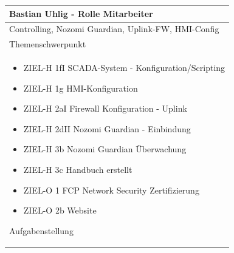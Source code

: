 \documentclass[
	headings=optiontotocandhead,%
	oneside,
	numbers=noenddot,%
	toc=flat, %
	10pt, %
	parskip=full, %
	listof=totoc, %
	listof=flat, %
	numbers=noenddot, %
	bibliography=totoc, %
	a4paper,DIV=14,
]{scrartcl}
\begin{document}
\begin{table}[H]
	\begin{tabularx} {\textwidth} {
			|>{\hsize=1\hsize}X|
		}
		
		\hline
		\rowcolor[HTML]{D9D9D9} 
		\rule{0pt}{15pt}
		\textbf{\normalsize{Bastian Uhlig - Rolle Mitarbeiter}} \\ \hline
		
		\rule{0pt}{20pt} Controlling, Nozomi Guardian, Uplink-FW, HMI-Config \\
		\rule{0pt}{11pt}\textcolor[HTML]{A6A6A6}{\footnotesize{Themenschwerpunkt}} \\ \hline
		
		\begin{itemize}[itemsep=0pt, parsep=0pt, topsep=0pt]
			\item{ZIEL-H 1fI SCADA-System - Konfiguration/Scripting}
			\item{ZIEL-H 1g HMI-Konfiguration}
			\item{ZIEL-H 2aI Firewall Konfiguration - Uplink}
			\item{ZIEL-H 2dII Nozomi Guardian - Einbindung}
			\item{ZIEL-H 3b Nozomi Guardian Überwachung}
			\item{ZIEL-H 3c Handbuch erstellt}
			\item{ZIEL-O 1 FCP Network Security Zertifizierung}
			\item{ZIEL-O 2b Website}
		\end{itemize}
		
		\rule{0pt}{11pt}\textcolor[HTML]{A6A6A6}{\footnotesize{Aufgabenstellung}} \\ \hline
	\end{tabularx}
\end{table}
\end{document}
